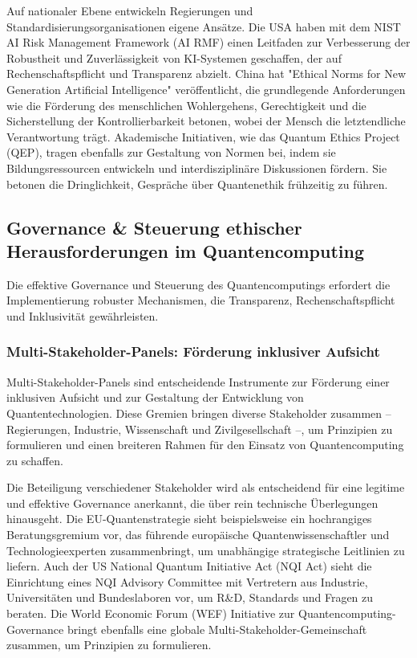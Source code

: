 Auf nationaler Ebene entwickeln Regierungen und Standardisierungsorganisationen eigene Ansätze. Die USA haben mit dem NIST AI Risk Management Framework (AI RMF) einen Leitfaden zur Verbesserung der Robustheit und Zuverlässigkeit von KI-Systemen geschaffen, der auf Rechenschaftspflicht und Transparenz abzielt. China hat "Ethical Norms for New Generation Artificial Intelligence" veröffentlicht, die grundlegende Anforderungen wie die Förderung des menschlichen Wohlergehens, Gerechtigkeit und die Sicherstellung der Kontrollierbarkeit betonen, wobei der Mensch die letztendliche Verantwortung trägt.\cite{noauthor_ethical_nodate}\cite{noauthor_nist_nodate} Akademische Initiativen, wie das Quantum Ethics Project (QEP), tragen ebenfalls zur Gestaltung von Normen bei, indem sie Bildungsressourcen entwickeln und interdisziplinäre Diskussionen fördern. Sie betonen die Dringlichkeit, Gespräche über Quantenethik frühzeitig zu führen. \cite{arrow_holistic_2023}


\subsection{Governance \& Steuerung ethischer Herausforderungen im Quantencomputing}
Die effektive Governance und Steuerung des Quantencomputings erfordert die Implementierung robuster Mechanismen, die Transparenz, Rechenschaftspflicht und Inklusivität gewährleisten.


\subsubsection{Multi-Stakeholder-Panels: Förderung inklusiver Aufsicht}
Multi-Stakeholder-Panels sind entscheidende Instrumente zur Förderung einer inklusiven Aufsicht und zur Gestaltung der Entwicklung von Quantentechnologien. Diese Gremien bringen diverse Stakeholder zusammen – Regierungen, Industrie, Wissenschaft und Zivilgesellschaft –, um Prinzipien zu formulieren und einen breiteren Rahmen für den Einsatz von Quantencomputing zu schaffen.

Die Beteiligung verschiedener Stakeholder wird als entscheidend für eine legitime und effektive Governance anerkannt, die über rein technische Überlegungen hinausgeht.\cite{noauthor_commission_nodate} Die EU-Quantenstrategie sieht beispielsweise ein hochrangiges Beratungsgremium vor, das führende europäische Quantenwissenschaftler und Technologieexperten zusammenbringt, um unabhängige strategische Leitlinien zu liefern.\cite{noauthor_commission_nodate} Auch der US National Quantum Initiative Act (NQI Act) sieht die Einrichtung eines NQI Advisory Committee mit Vertretern aus Industrie, Universitäten und Bundeslaboren vor, um R\&D, Standards und Fragen zu beraten.\cite{noauthor_national_nodate} Die World Economic Forum (WEF) Initiative zur Quantencomputing-Governance bringt ebenfalls eine globale Multi-Stakeholder-Gemeinschaft zusammen, um Prinzipien zu formulieren.\cite{noauthor_quantum_2023} 

